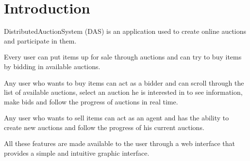 \section{Introduction}

DistributedAuctionSystem (DAS) is an application used to create online auctions
and participate in them.

Every user can  put items up for sale through auctions and can try to buy items
by bidding in available auctions.

Any user who wants to buy items can act as a bidder and can scroll through the
list of available auctions, select an auction he is interested in to see
information, make bids and follow the progress of auctions in real time.

Any user who wants to sell items can act as an agent and has the ability to
create new auctions and follow the progress of his current auctions.

All these features are made available to the user through a web interface that
provides a simple and intuitive graphic interface.
